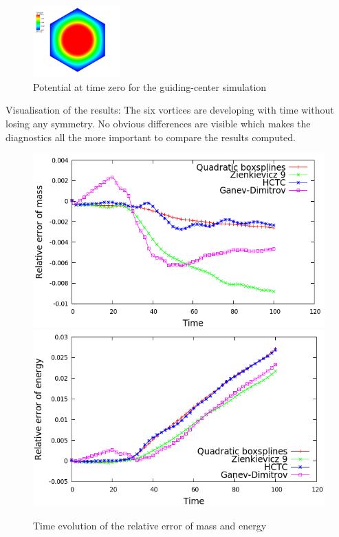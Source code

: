 \documentclass[proc]{edpsmath}
\begin{document}
\begin{figure}[h!]
	\includegraphics[width=0.3\textwidth]{figures/gc_phi_t0.png}
	\caption{Potential at time zero for the guiding-center simulation}
	\label{phi}
\end{figure}

Visualisation of the results: The six vortices are developing with time without losing any symmetry. No obvious differences are visible which makes the diagnostics all the more important to compare the results computed.


\begin{figure}[h!]
	\includegraphics[scale=0.3]{figures/mass_cg.png}
	\includegraphics[scale=0.3]{figures/energy_cg.png}
	\caption{Time evolution of the relative error of mass and energy}
\end{figure}
\end{document}
